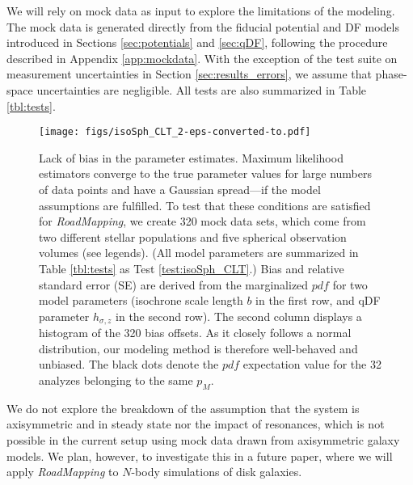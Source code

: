 \documentclass[iop,revtex4,numberedappendix,appendixfloats]{emulateapj}
\newcommand{\pdf}{\ensuremath{pdf}}
\newcommand{\pmodel}{\ensuremath{p_M}}
\newcommand{\RM}{{\sl RoadMapping}}
\begin{document}
We will rely on mock data as input to explore the limitations of the modeling. The mock data is generated directly from the fiducial potential and DF models introduced in Sections \ref{sec:potentials} and \ref{sec:qDF}, following the procedure described in Appendix \ref{app:mockdata}. With the exception of the test suite on measurement uncertainties in Section \ref{sec:results_errors}, we assume that phase-space uncertainties are negligible. All tests are also summarized in Table \ref{tbl:tests}. 

\begin{figure}[!htbp]
\centering
\texttt{[image: figs/isoSph\_CLT\_2-eps-converted-to.pdf]}
\caption{Lack of bias in the parameter estimates. Maximum likelihood estimators converge to the true parameter values for large numbers of data points and have a Gaussian spread---if the model assumptions are fulfilled. To test that these conditions are satisfied for \RM{}, we create 320 mock data sets, which come from two different stellar populations and five spherical observation volumes (see legends). (All model parameters are summarized in Table \ref{tbl:tests} as Test \ref{test:isoSph_CLT}.) Bias and relative standard error (SE) are derived from the marginalized \pdf{} for two model parameters (isochrone scale length $b$ in the first row, and qDF parameter $h_{\sigma,z}$ in the second row). The second column displays a histogram of the 320 bias offsets. As it closely follows a normal distribution, our modeling method is therefore well-behaved and unbiased. The black dots denote the \pdf{} expectation value for the 32 analyzes belonging to the same $\pmodel{}$.}
\label{fig:isoSph_CLT}
\end{figure}

We do not explore the breakdown of the assumption that the system is axisymmetric and in steady state nor the impact of resonances, which is not possible in the current setup using mock data drawn from axisymmetric galaxy models. We plan, however, to investigate this in a future paper, where we will apply \RM{} to $N$-body simulations of disk galaxies.


\end{document}
